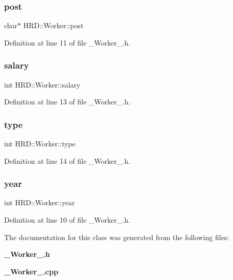 \subsubsection{post}
{\footnotesize\ttfamily char$\ast$ H\+R\+D\+::\+Worker\+::post\hspace{0.3cm}{\ttfamily [protected]}}



Definition at line 11 of file \+\_\+\+Worker\+\_\+.\+h.

\mbox{\label{class_h_r_d_1_1_worker_a82ca5a4ad2e0347f4fa663519f14550f}} 
\subsubsection{salary}
{\footnotesize\ttfamily int H\+R\+D\+::\+Worker\+::salary\hspace{0.3cm}{\ttfamily [protected]}}



Definition at line 13 of file \+\_\+\+Worker\+\_\+.\+h.

\mbox{\label{class_h_r_d_1_1_worker_acfdaa671f5b87e440310da74d89ffe85}} 
\subsubsection{type}
{\footnotesize\ttfamily int H\+R\+D\+::\+Worker\+::type\hspace{0.3cm}{\ttfamily [protected]}}



Definition at line 14 of file \+\_\+\+Worker\+\_\+.\+h.

\mbox{\label{class_h_r_d_1_1_worker_a2db533aa6e323c5f55dd3d9c9c786d13}} 
\subsubsection{year}
{\footnotesize\ttfamily int H\+R\+D\+::\+Worker\+::year\hspace{0.3cm}{\ttfamily [protected]}}



Definition at line 10 of file \+\_\+\+Worker\+\_\+.\+h.



The documentation for this class was generated from the following files\+:\begin{DoxyCompactItemize}
\item 
\textbf{ \+\_\+\+Worker\+\_\+.\+h}\item 
\textbf{ \+\_\+\+Worker\+\_\+.\+cpp}\end{DoxyCompactItemize}
